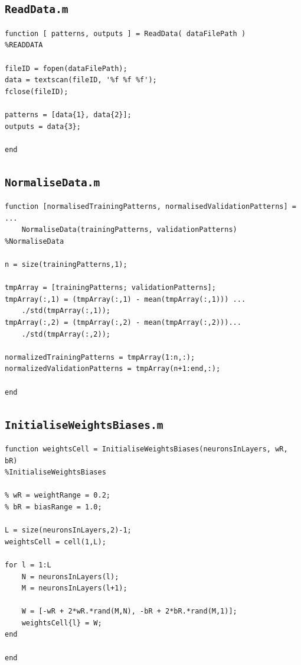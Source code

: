 \documentclass[12pt,titlepage]{article}
\begin{document}
\subsection*{\texttt{ReadData.m}}

\begin{lstlisting}
function [ patterns, outputs ] = ReadData( dataFilePath )
%READDATA

fileID = fopen(dataFilePath);
data = textscan(fileID, '%f %f %f');
fclose(fileID);

patterns = [data{1}, data{2}];
outputs = data{3};

end
\end{lstlisting}

\subsection*{\texttt{NormaliseData.m}}

\begin{lstlisting}
function [normalisedTrainingPatterns, normalisedValidationPatterns] = ...
    NormaliseData(trainingPatterns, validationPatterns)
%NormaliseData

n = size(trainingPatterns,1);

tmpArray = [trainingPatterns; validationPatterns];
tmpArray(:,1) = (tmpArray(:,1) - mean(tmpArray(:,1))) ...
    ./std(tmpArray(:,1));
tmpArray(:,2) = (tmpArray(:,2) - mean(tmpArray(:,2)))...
    ./std(tmpArray(:,2));

normalizedTrainingPatterns = tmpArray(1:n,:);
normalizedValidationPatterns = tmpArray(n+1:end,:);

end
\end{lstlisting}

\subsection*{\texttt{InitialiseWeightsBiases.m}}

\begin{lstlisting}
function weightsCell = InitialiseWeightsBiases(neuronsInLayers, wR, bR)
%InitialiseWeightsBiases

% wR = weightRange = 0.2;
% bR = biasRange = 1.0;

L = size(neuronsInLayers,2)-1;
weightsCell = cell(1,L);

for l = 1:L
    N = neuronsInLayers(l);
    M = neuronsInLayers(l+1);

    W = [-wR + 2*wR.*rand(M,N), -bR + 2*bR.*rand(M,1)];
    weightsCell{l} = W;
end

end
\end{lstlisting}
\clearpage
\end{document}
